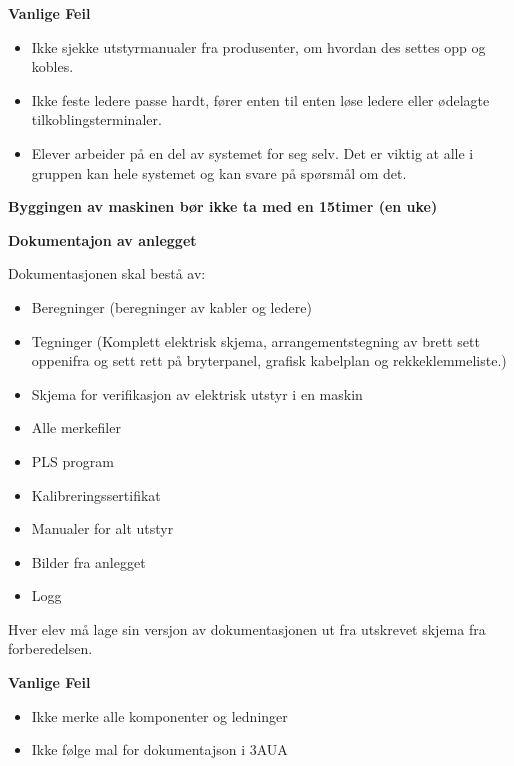 \vskip 10pt

\textbf{Vanlige Feil}
\begin{itemize}[noitemsep]
	\item Ikke sjekke utstyrmanualer fra produsenter, om hvordan des settes opp og kobles. 
	\item Ikke feste ledere passe hardt, fører enten til enten løse ledere eller ødelagte tilkoblingsterminaler.
	\item Elever arbeider på en del av systemet for seg selv. Det er viktig at alle i gruppen kan hele systemet og kan svare på spørsmål om det.  
\end{itemize}

\vskip 10pt 

\textbf{Byggingen av maskinen bør ikke ta med en 15timer (en uke)}

\vfil \eject

\noindent
\textbf{Dokumentajon av anlegget}

\vskip 10pt 
Dokumentasjonen skal bestå av:
\begin{itemize}[noitemsep]
	\item Beregninger (beregninger av kabler og ledere)
	\item Tegninger (Komplett elektrisk skjema, arrangementstegning av brett sett oppenifra og sett rett på bryterpanel, grafisk kabelplan og rekkeklemmeliste.)
	\item Skjema for verifikasjon av elektrisk utstyr i en maskin
	\item Alle merkefiler
	\item PLS program
	\item Kalibreringssertifikat
	\item Manualer for alt utstyr
	\item Bilder fra anlegget
	\item Logg
\end{itemize}


Hver elev må lage sin versjon av dokumentasjonen ut fra utskrevet skjema fra forberedelsen. 





\vskip 10pt

\textbf{Vanlige Feil}
\vskip 10pt
\begin{itemize}[noitemsep]
	\item Ikke merke alle komponenter og ledninger
	\item Ikke følge mal for dokumentajson i 3AUA
\end{itemize}


